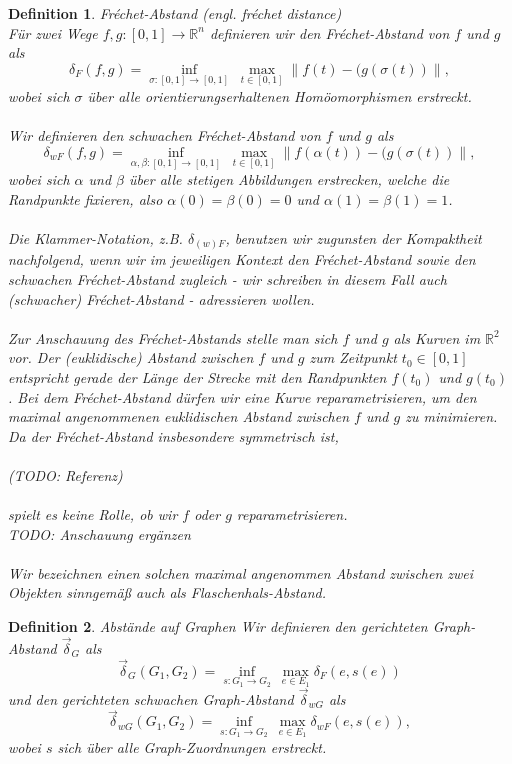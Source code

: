 \documentclass[a4paper, 12pt, twoside]{article}
\theoremstyle{Format1} %
\newtheorem{Def}{Definition}[section]       %
\begin{document}
\begin{Def} \label{Definition Fréchet-Abstand}
	Fréchet-Abstand (engl. fréchet distance)
	\\
	Für zwei Wege $ f, g: [0,1] \to \mathbb{R}^n $ definieren wir den \textit{Fréchet-Abstand} von $f$ und $g$ als
	$$ \delta_F(f,g) =  \inf_{\sigma:[0,1] \to [0,1]} \; \max_{t \in [0,1]} \lVert f(t)-(g(\sigma(t)) \rVert, $$
	wobei sich $\sigma $ über alle orientierungserhaltenen Homöomorphismen erstreckt.
	\\
	\\
	Wir definieren den \textit{schwachen Fréchet-Abstand} von $f$ und $g$ als
	$$\delta_{wF}(f,g) =\inf_{\alpha , \beta :[0,1] \to [0,1]} \; \max_{t \in [0,1]} \lVert f(\alpha(t))-(g(\sigma(t)) \rVert,$$
	wobei sich $\alpha$ und $\beta$ über alle stetigen Abbildungen erstrecken, welche die Randpunkte fixieren, also $\alpha(0) = \beta(0) = 0$
	und $\alpha(1) = \beta(1) = 1$.
	\\
	\\
	Die Klammer-Notation, z.B. $ \delta_{(w)F} $, benutzen wir zugunsten der Kompaktheit nachfolgend, wenn wir im jeweiligen Kontext den Fréchet-Abstand sowie den schwachen Fréchet-Abstand zugleich -
	wir schreiben in diesem Fall auch \textit{(schwacher) Fréchet-Abstand} - adressieren wollen.
	\\
	\\
	Zur Anschauung des Fréchet-Abstands stelle man sich $f$ und $g$ als Kurven im $\mathbb{R}^2$ vor. Der (euklidische) Abstand zwischen $f$ und $g$ zum Zeitpunkt $t_0 \in [0,1]$ entspricht gerade der Länge der Strecke
	mit den Randpunkten $f(t_0)$ und $g(t_0)$. Bei dem Fréchet-Abstand dürfen wir eine Kurve reparametrisieren, um den maximal angenommenen euklidischen Abstand zwischen $f$ und $g$ zu minimieren.
	Da der Fréchet-Abstand insbesondere symmetrisch ist,
	\\
	\\
	(TODO: Referenz)
	\\
	\\
	spielt es keine Rolle, ob wir $f$ oder $g$ reparametrisieren.
	\\
	TODO: Anschauung ergänzen
	\\
	\\
	Wir bezeichnen einen solchen maximal angenommen Abstand zwischen zwei Objekten sinngemäß auch als \textit{Flaschenhals-Abstand}.
\end{Def}

\begin{Def} \label{Definition Graph-Abstand}
	Abstände auf Graphen
	Wir definieren den \textit{gerichteten Graph-Abstand} $ \vec{\delta}_G $ als
	$$ \vec{\delta}_G(G_1,G_2) = \inf_{s: G_1 \to G_2} \: \max_{e \in E_1} \delta_F(e, s(e)) $$
	und den \textit{gerichteten schwachen Graph-Abstand} $ \vec{\delta}_{wG} $ als
	$$  \vec{\delta}_{wG}(G_1,G_2) = \inf_{s: G_1 \to G_2} \: \max_{e \in E_1} {\delta}_{wF}(e, s(e)), $$
	wobei $s$ sich über alle Graph-Zuordnungen erstreckt.
\end{Def}
\end{document}
